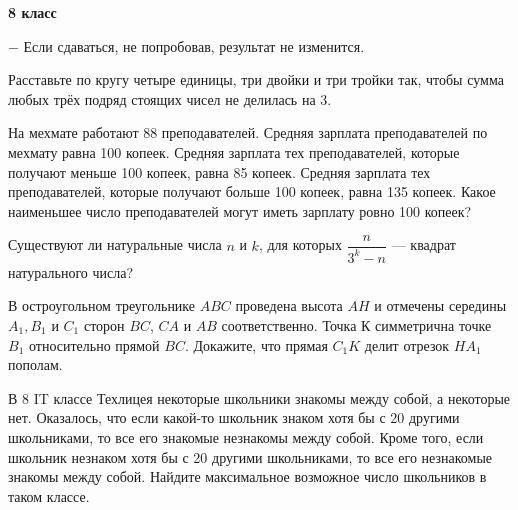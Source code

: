 \hspace{3mm}

\centerline{\bf \huge 8 класс}

\begin{flushright}
        \scriptsize{ $-$ Если сдаваться, не попробовав, результат не изменится.}
\end{flushright}


Расставьте по кругу четыре единицы, три двойки и три тройки так, чтобы сумма любых трёх подряд стоящих чисел не делилась на 3.

На мехмате работают 88 преподавателей. Средняя зарплата преподавателей по мехмату равна 100 копеек. Средняя зарплата тех преподавателей, которые получают меньше 100 копеек, равна 85 копеек. Средняя зарплата тех преподавателей, которые получают больше 100 копеек, равна 135 копеек. Какое наименьшее число преподавателей могут иметь зарплату ровно 100 копеек? 

Существуют ли натуральные числа $n$ и $k$, для которых $\dfrac{n}{3^k-n}$ --- квадрат натурального числа?

В остроугольном треугольнике $A B C$ проведена высота $A H$ и отмечены середины $A_1, B_1$ и $C_1$ сторон $B C$, $CA$ и $A B$ соответственно. Точка $К$ симметрична точке $B_1$ относительно прямой $B C$. Докажите, что прямая $C_1 K$ делит отрезок $H A_1$ пополам.

В 8 IT классе Техлицея некоторые школьники знакомы между собой, а некоторые нет. Оказалось, что если какой-то школьник знаком хотя бы с $20$ другими школьниками, то все его знакомые незнакомы между собой. Кроме того, если школьник незнаком хотя бы с 20 другими школьниками, то все его незнакомые знакомы между собой. Найдите максимальное возможное число школьников в таком классе.